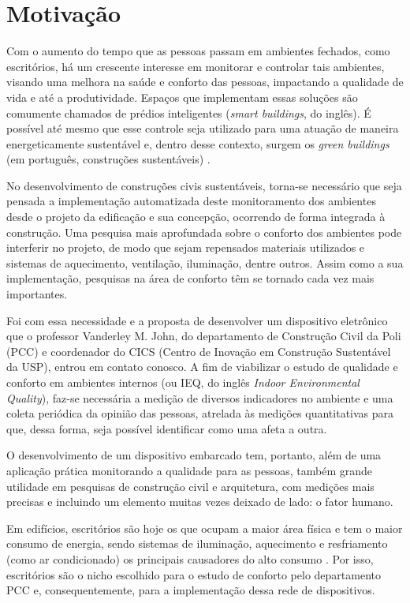 \documentclass[../monografia.tex]{subfiles}
\begin{document}
\section{Motivação}

Com o aumento do tempo que as pessoas passam em ambientes fechados, como escritórios, há um crescente interesse em monitorar e controlar tais ambientes, visando uma melhora na saúde e conforto das pessoas, impactando a qualidade de vida e até a produtividade. Espaços que implementam essas soluções são comumente chamados de prédios inteligentes (\textit{smart buildings}, do inglês). É possível até mesmo que esse controle seja utilizado para uma atuação de maneira energeticamente sustentável e, dentro desse contexto, surgem os \textit{green buildings} (em português, construções sustentáveis) \cite{GreenBuildings} \cite{EnergyBuildings}.

No desenvolvimento de construções civis sustentáveis, torna-se necessário que seja pensada a implementação automatizada deste monitoramento dos ambientes desde o projeto da edificação e sua concepção, ocorrendo de forma integrada à construção. Uma pesquisa mais aprofundada sobre o conforto dos ambientes pode interferir no projeto, de modo que sejam repensados materiais utilizados e sistemas de aquecimento, ventilação, iluminação, dentre outros. Assim como a sua implementação, pesquisas na área de conforto têm se tornado cada vez mais importantes. 

Foi com essa necessidade e a proposta de desenvolver um dispositivo eletrônico que o professor Vanderley M. John, do departamento de Construção Civil da Poli (PCC) e coordenador do CICS (Centro de Inovação em Construção Sustentável da USP)\cite{CICS}, entrou em contato conosco. A fim de viabilizar o estudo de qualidade e conforto em ambientes internos (ou IEQ, do inglês \textit{Indoor Environmental Quality}), faz-se necessária a medição de diversos indicadores no ambiente e uma coleta periódica da opinião das pessoas, atrelada às medições quantitativas para que, dessa forma, seja possível identificar como uma afeta a outra. 

O desenvolvimento de um dispositivo embarcado tem, portanto, além de uma aplicação prática monitorando a qualidade para as pessoas, também grande utilidade em pesquisas de construção civil e arquitetura, com medições mais precisas e incluindo um elemento muitas vezes deixado de lado: o fator humano.

Em edifícios, escritórios são hoje os que ocupam a maior área física e tem o maior consumo de energia, sendo sistemas de iluminação, aquecimento e resfriamento (como ar condicionado) os principais causadores do alto consumo \cite{EnergyBuildings}. Por isso, escritórios são o nicho escolhido para o estudo de conforto pelo departamento PCC e, consequentemente, para a implementação dessa rede de dispositivos. 
\end{document}

